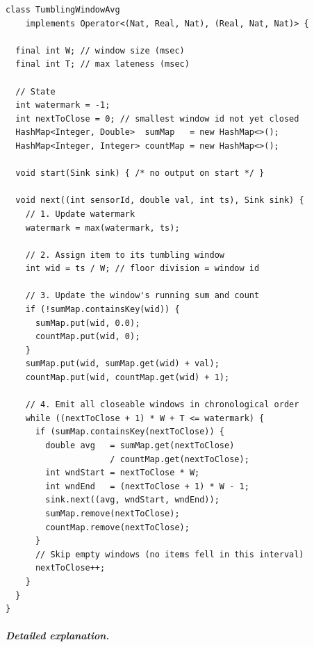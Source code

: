 \documentclass[11pt]{article}
\theoremstyle{definition}
\begin{document}
\begin{verbatim}
class TumblingWindowAvg
    implements Operator<(Nat, Real, Nat), (Real, Nat, Nat)> {

  final int W; // window size (msec)
  final int T; // max lateness (msec)

  // State
  int watermark = -1;
  int nextToClose = 0; // smallest window id not yet closed
  HashMap<Integer, Double>  sumMap   = new HashMap<>();
  HashMap<Integer, Integer> countMap = new HashMap<>();

  void start(Sink sink) { /* no output on start */ }

  void next((int sensorId, double val, int ts), Sink sink) {
    // 1. Update watermark
    watermark = max(watermark, ts);

    // 2. Assign item to its tumbling window
    int wid = ts / W; // floor division = window id

    // 3. Update the window's running sum and count
    if (!sumMap.containsKey(wid)) {
      sumMap.put(wid, 0.0);
      countMap.put(wid, 0);
    }
    sumMap.put(wid, sumMap.get(wid) + val);
    countMap.put(wid, countMap.get(wid) + 1);

    // 4. Emit all closeable windows in chronological order
    while ((nextToClose + 1) * W + T <= watermark) {
      if (sumMap.containsKey(nextToClose)) {
        double avg   = sumMap.get(nextToClose)
                     / countMap.get(nextToClose);
        int wndStart = nextToClose * W;
        int wndEnd   = (nextToClose + 1) * W - 1;
        sink.next((avg, wndStart, wndEnd));
        sumMap.remove(nextToClose);
        countMap.remove(nextToClose);
      }
      // Skip empty windows (no items fell in this interval)
      nextToClose++;
    }
  }
}
\end{verbatim}

\subparagraph{Detailed explanation.}
\end{document}
